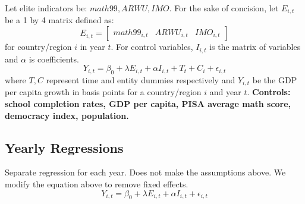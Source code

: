 \documentclass[11pt]{article}
\begin{document}
Let elite indicators be: $math99, ARWU, IMO$.
For the sake of concision, let $E_{i,t}$ be a 1 by 4 matrix defined as:
\[E_{i,t} = 
\begin{bmatrix}
    math99_{i, t} & ARWU_{i, t} & IMO_{i, t}
\end{bmatrix}
\] for country/region $i$ in year $t$.
For control variables, $I_{i, t}$ is the matrix of variables and $\alpha$ is coefficients.
\begin{equation}
    Y_{i, t} = \beta_0 + \lambda E_{i, t} + \alpha I_{i, t} + T_t + C_i + \epsilon_{i, t}
\end{equation}
where $T,C$ represent time and entity dummies respectively and $Y_{i,t}$ be the GDP per capita growth in basis points for a country/region $i$ and year $t$.
\textbf{Controls: school completion rates, GDP per capita, PISA average math score, democracy index, population.}

\subsection{Yearly Regressions}
Separate regression for each year. Does not make the assumptions above. We modify the equation above to remove fixed effects.
\begin{equation}
    Y_{i, t} = \beta_0 + \lambda E_{i, t} + \alpha I_{i, t} + \epsilon_{i, t}
\end{equation}
\end{document}
